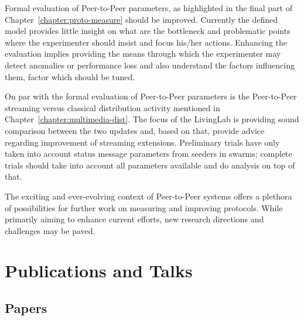 Formal evaluation of Peer-to-Peer parameters, as highlighted in the final part
of Chapter~\ref{chapter:proto-measure} should be improved. Currently the
defined model provides little insight on what are the bottleneck and
problematic points where the experimenter should insist and focus his/her
actions. Enhancing the evaluation implies providing the means through which
the experimenter may detect anomalies or performance loss and also understand
the factors influencing them, factor which should be tuned.

On par with the formal evaluation of Peer-to-Peer parameters is the
Peer-to-Peer streaming versus classical distribution activity mentioned in
Chapter~\ref{chapter:multimedia-dist}. The focus of the LivingLab is
providing sound comparison between the two updates and, based on that, provide
advice regarding improvement of streaming extensions. Preliminary trials have
only taken into account status message parameters from seeders in swarms;
complete trials should take into account all parameters available and do
analysis on top of that.

The exciting and ever-evolving context of Peer-to-Peer systems offers a
plethora of possibilities for further work on measuring and improving
protocols. While primarily aiming to enhance current efforts, new research
directions and challenges may be paved.

\section{Publications and Talks}
\label{sec:conclusion:publications}

\subsection{Papers}

